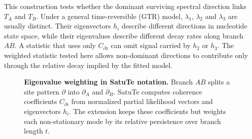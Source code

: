 \documentclass[11pt]{article}
\begin{document}
This construction tests whether the dominant surviving spectral direction links \(T_A\) and \(T_B\). Under a general time-reversible (GTR) model, \(\lambda_1\), \(\lambda_2\) and \(\lambda_3\) are usually distinct. Their eigenvectors \(h_i\) describe different directions in nucleotide state space, while their eigenvalues describe different decay rates along branch \(AB\). A statistic that uses only \(C_{\partial 1}\) can omit signal carried by \(h_2\) or \(h_3\). The weighted statistic tested here allows non-dominant directions to contribute only through the relative decay implied by the fitted model.

\begin{figure}[htbp]
  \centering
  \caption{\textbf{Eigenvalue weighting in SatuTe notation.} Branch \(AB\) splits a site pattern \(\partial\) into \(\partial_A\) and \(\partial_B\). SatuTe computes coherence coefficients \(C_{\partial i}\) from normalized partial likelihood vectors and eigenvectors \(h_i\). The extension keeps these coefficients but weights each non-stationary mode by its relative persistence over branch length \(t\).}
\end{figure}
\end{document}
